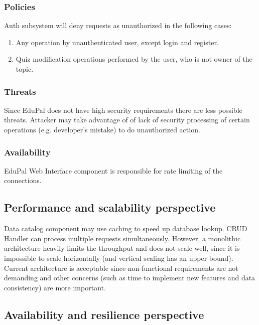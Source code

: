 \subsubsection{Policies}

Auth subsystem will deny requests as unauthorized in the following cases:

\begin{enumerate}
  \item Any operation by unauthenticated user, except login and register.
  \item Quiz modification operations performed by the user, who is not owner of the topic.
\end{enumerate}

\subsubsection{Threats}

Since EduPal does not have high security requirements there are less possible threats. Attacker may take advantage of of lack of security processing of certain operations (e.g. developer's mistake) to do unauthorized action.

\subsubsection{Availability}

EduPal Web Interface component is responsible for rate limiting of the connections.

\subsection{Performance and scalability perspective}

Data catalog component may use caching to speed up database lookup. CRUD Handler can process multiple requests simultaneously. However, a monolithic architecture heavily limits the throughput and does not scale well, since it is impossible to scale horizontally (and vertical scaling has an upper bound). Current architecture is acceptable since non-functional requirements are not demanding and other concerns (such as time to implement new features and data consistency) are more important.

\subsection{Availability and resilience perspective}

